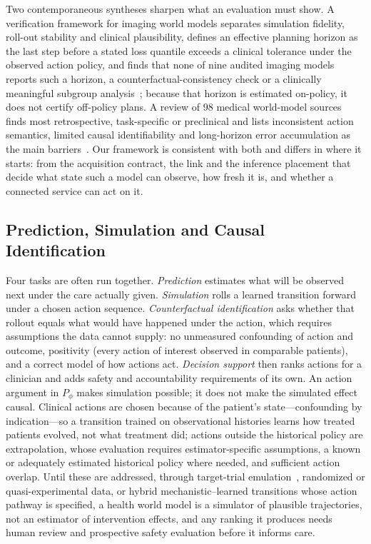 \documentclass[journal]{IEEEtran}
\begin{document}
Two contemporaneous syntheses sharpen what an evaluation must show. A verification framework for imaging world models separates simulation fidelity, roll-out stability and clinical plausibility, defines an effective planning horizon as the last step before a stated loss quantile exceeds a clinical tolerance under the observed action policy, and finds that none of nine audited imaging models reports such a horizon, a counterfactual-consistency check or a clinically meaningful subgroup analysis~\cite{wimalasiri2026verifiable}; because that horizon is estimated on-policy, it does not certify off-policy plans. A review of 98 medical world-model sources finds most retrospective, task-specific or preclinical and lists inconsistent action semantics, limited causal identifiability and long-horizon error accumulation as the main barriers~\cite{chen2026medicalwm}. Our framework is consistent with both and differs in where it starts: from the acquisition contract, the link and the inference placement that decide what state such a model can observe, how fresh it is, and whether a connected service can act on it.

\subsection{Prediction, Simulation and Causal Identification}
\label{sec:causal}
Four tasks are often run together. \emph{Prediction} estimates what will be observed next under the care actually given. \emph{Simulation} rolls a learned transition forward under a chosen action sequence. \emph{Counterfactual identification} asks whether that rollout equals what would have happened under the action, which requires assumptions the data cannot supply: no unmeasured confounding of action and outcome, positivity (every action of interest observed in comparable patients), and a correct model of how actions act. \emph{Decision support} then ranks actions for a clinician and adds safety and accountability requirements of its own. An action argument in $P_\phi$ makes simulation possible; it does not make the simulated effect causal. Clinical actions are chosen because of the patient's state---confounding by indication---so a transition trained on observational histories learns how treated patients evolved, not what treatment did; actions outside the historical policy are extrapolation, whose evaluation requires estimator-specific assumptions, a known or adequately estimated historical policy where needed, and sufficient action overlap. Until these are addressed, through target-trial emulation~\cite{hernan2016targettrial}, randomized or quasi-experimental data, or hybrid mechanistic--learned transitions whose action pathway is specified, a health world model is a simulator of plausible trajectories, not an estimator of intervention effects, and any ranking it produces needs human review and prospective safety evaluation before it informs care.
\end{document}
